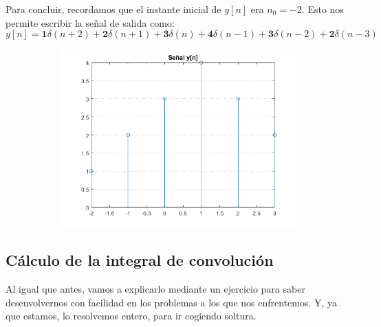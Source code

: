 \documentclass[a4paper]{book}
\begin{document}
Para concluir, recordamos que el instante inicial de $y[n]$ era $n_0=-2$. Esto nos permite escribir la señal de salida como: \[y[n] = \mathbf{1}\delta (n+2) + \mathbf{2}\delta (n+1) + \mathbf{3}\delta (n) + \mathbf{4}\delta (n-1) + \mathbf{3}\delta (n-2) + \mathbf{2}\delta (n-3)\]

\begin{figure}[!ht]
	\caption{}
	\label{fig:Problema_2_c}
	\centering
	\begin{subfigure}[b]{0.7\linewidth}
		\includegraphics[width=\linewidth]{./Imágenes/aaq.png}
	\end{subfigure}
\end{figure}

\setlength{\leftskip}{0pt}
\setlength{\rightskip}{0pt}

\subsection{Cálculo de la integral de convolución}
Al igual que antes, vamos a explicarlo mediante un ejercicio para saber desenvolvernos con facilidad en los problemas a los que nos enfrentemos. Y, ya que estamos, lo resolvemos entero, para ir cogiendo soltura.
\vspace{\parskip}


\setlength{\leftskip}{0.5cm}
\setlength{\rightskip}{0.5cm}
\end{document}
